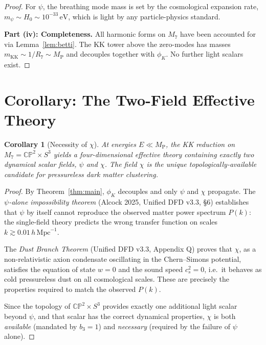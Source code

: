 \documentclass[12pt,a4paper]{article}
\newtheorem{corollary}[theorem]{Corollary}
\theoremstyle{definition}
\theoremstyle{remark}
\newcommand{\CP}{\mathbb{CP}}
\newcommand{\MP}{M_{\mathrm{P}}}
\begin{document}
\begin{proof}
For $\psi$, the breathing mode mass is set by the cosmological
expansion rate, $m_\psi \sim H_0 \sim 10^{-33}\,\mathrm{eV}$,
which is light by any particle-physics standard.

\medskip
\noindent\textbf{Part (iv): Completeness.}
All harmonic forms on $M_7$ have been accounted for via
Lemma~\ref{lem:betti}. The KK tower above the zero-modes has masses
$m_{\mathrm{KK}} \sim 1/R_7 \sim \MP$ and decouples together with
$\phi_K$.  No further light scalars exist.
\end{proof}

\section{Corollary: The Two-Field Effective Theory}

\begin{corollary}[Necessity of $\chi$]\label{cor:necessity}
At energies $E \ll \MP$, the KK reduction on
$M_7 = \CP^2 \times S^3$ yields a four-dimensional effective theory
containing exactly two dynamical scalar fields, $\psi$ and $\chi$.
The field $\chi$ is the unique topologically-available candidate for
pressureless dark matter clustering.
\end{corollary}

\begin{proof}
By Theorem~\ref{thm:main}, $\phi_K$ decouples and only $\psi$ and
$\chi$ propagate.  The \emph{$\psi$-alone impossibility theorem}
(Alcock 2025, Unified DFD v3.3, \S6) establishes that $\psi$ by itself
cannot reproduce the observed matter power spectrum $P(k)$: the
single-field theory predicts the wrong transfer function on scales
$k \gtrsim 0.01\,h\,\mathrm{Mpc}^{-1}$.

The \emph{Dust Branch Theorem} (Unified DFD v3.3, Appendix Q)
proves that $\chi$, as a non-relativistic axion condensate oscillating
in the Chern--Simons potential, satisfies the equation of state $w = 0$
and the sound speed $c_s^2 = 0$, i.e.\ it behaves as cold pressureless
dust on all cosmological scales.  These are precisely the properties
required to match the observed $P(k)$.

Since the topology of $\CP^2 \times S^3$ provides exactly one
additional light scalar beyond $\psi$, and that scalar has the correct
dynamical properties, $\chi$ is both \emph{available} (mandated by
$b_3 = 1$) and \emph{necessary} (required by the failure of $\psi$
alone).
\end{proof}
\end{document}
